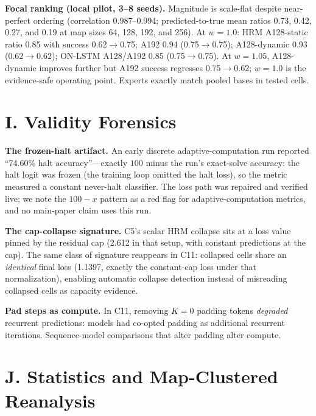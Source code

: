 \documentclass[letterpaper]{article} %
\newcommand{\stage}[1]{\textsc{#1}}
\begin{document}
\textbf{Focal ranking (local pilot, 3--8 seeds).} Magnitude is scale-flat despite near-perfect ordering (correlation 0.987--0.994; predicted-to-true mean ratios 0.73, 0.42, 0.27, and 0.19 at map sizes 64, 128, 192, and 256). At $w{=}1.0$: HRM A128-static ratio 0.85 with success 0.62$\to$0.75; A192 0.94 (0.75$\to$0.75); A128-dynamic 0.93 (0.62$\to$0.62); ON-LSTM A128/A192 0.85 (0.75$\to$0.75). At $w{=}1.05$, A128-dynamic improves further but A192 success regresses 0.75$\to$0.62; $w{=}1.0$ is the evidence-safe operating point. Experts exactly match pooled bases in tested cells.

\section{I. Validity Forensics}

\textbf{The frozen-halt artifact.} An early discrete adaptive-computation run reported ``74.60\% halt accuracy''---exactly $100$ minus the run's exact-solve accuracy: the halt logit was frozen (the training loop omitted the halt loss), so the metric measured a constant never-halt classifier. The loss path was repaired and verified live; we note the $100{-}x$ pattern as a red flag for adaptive-computation metrics, and no main-paper claim uses this run.

\textbf{The cap-collapse signature.} \stage{C5}'s scalar HRM collapse sits at a loss value pinned by the residual cap (2.612 in that setup, with constant predictions at the cap). The same class of signature reappears in \stage{C11}: collapsed cells share an \emph{identical} final loss (1.1397, exactly the constant-cap loss under that normalization), enabling automatic collapse detection instead of misreading collapsed cells as capacity evidence.

\textbf{Pad steps as compute.} In \stage{C11}, removing $K{=}0$ padding tokens \emph{degraded} recurrent predictions: models had co-opted padding as additional recurrent iterations. Sequence-model comparisons that alter padding alter compute.

\section{J. Statistics and Map-Clustered Reanalysis}
\end{document}
